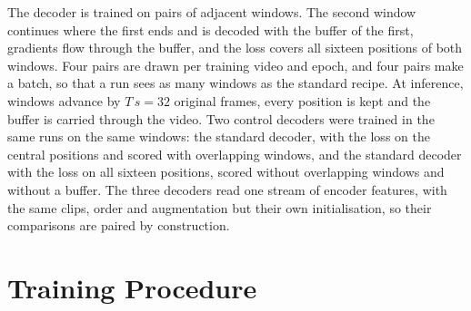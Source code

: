 The decoder is trained on pairs of adjacent windows. The second window
continues where the first ends and is decoded with the buffer of the first,
gradients flow through the buffer, and the loss covers all sixteen positions
of both windows. Four pairs are drawn per training video and epoch, and four
pairs make a batch, so that a run sees as many windows as the standard recipe.
At inference, windows advance by $T\,s=32$ original frames, every position is
kept and the buffer is carried through the video. Two control decoders were
trained in the same runs on the same windows: the standard decoder, with the
loss on the central positions and scored with overlapping windows, and the
standard decoder with the loss on all sixteen positions, scored without
overlapping windows and without a buffer. The three decoders read one stream
of encoder features, with the same clips, order and augmentation but their own
initialisation, so their comparisons are paired by construction.

\section{Training Procedure}\label{sec:training}

